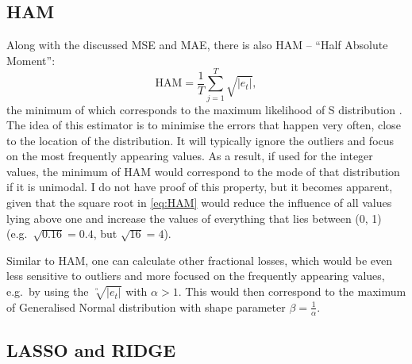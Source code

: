 \documentclass[]{book}
\theoremstyle{definition}
\theoremstyle{definition}
\theoremstyle{definition}
\theoremstyle{definition}
\theoremstyle{remark}
\begin{document}
\hypertarget{ham}{%
\subsection{HAM}\label{ham}}

Along with the discussed MSE and MAE, there is also HAM -- ``Half Absolute Moment'':
\begin{equation}
  \mathrm{HAM} = \frac{1}{T} \sum_{j=1}^T \sqrt{\left|e_t\right|},
  \label{eq:HAM}
\end{equation}
the minimum of which corresponds to the maximum likelihood of S distribution \citep[see Chapter 3 of][]{SvetunkovSBA}. The idea of this estimator is to minimise the errors that happen very often, close to the location of the distribution. It will typically ignore the outliers and focus on the most frequently appearing values. As a result, if used for the integer values, the minimum of HAM would correspond to the mode of that distribution if it is unimodal. I do not have proof of this property, but it becomes apparent, given that the square root in \eqref{eq:HAM} would reduce the influence of all values lying above one and increase the values of everything that lies between (0, 1) (e.g.~\(\sqrt{0.16}=0.4\), but \(\sqrt{16}=4\)).

Similar to HAM, one can calculate other fractional losses, which would be even less sensitive to outliers and more focused on the frequently appearing values, e.g.~by using the \(\sqrt[^\alpha]{\left|e_t\right|}\) with \(\alpha>1\). This would then correspond to the maximum of Generalised Normal distribution with shape parameter \(\beta=\frac{1}{\alpha}\).

\hypertarget{lasso-and-ridge}{%
\subsection{LASSO and RIDGE}\label{lasso-and-ridge}}
\end{document}
